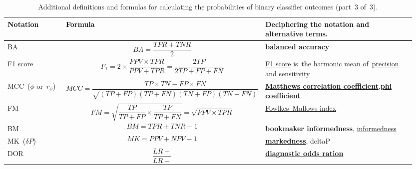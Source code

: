 \documentclass[]{scrreprt}
\begin{document}
\begin{table}[htp]
	\caption{Additional definitions and formulas for calculating the probabilities of binary classifier outcomes (part~3 of~3).}\label{tab:ROC-rates-3}
	\tiny
	\begin{tabularx}{\textwidth}{p{0.15\linewidth} p{0.4\linewidth} p{0.4\linewidth}} 
		\hline
		Notation&Formula&Deciphering the notation and alternative terms.\\
		\hline
		BA&\begin{equation}\label{eq:BA}
		BA = \frac{TPR+TNR}{2}
		\end{equation}&\textbf{balanced accuracy}\\
		\hline
		F1 score&\begin{equation}\label{eq:F1-score}
		F_{1} = 2 \times \frac{PPV \times TPR}{PPV +TPR} = \frac{2TP}{2TP + FP + FN}
		\end{equation}&\href{https://en.wikipedia.org/wiki/F-score}{F1 score} is~the harmonic mean of~\href{https://en.wikipedia.org/wiki/Information_retrieval\#Precision}{precision} and \href{https://en.wikipedia.org/wiki/Sensitivity_(test)}{sensitivity}~\cite{Wiki:F-score}\\
		\hline
		MCC~($\phi$ or~$r_{\phi}$)&\begin{equation}\label{eq:MCC}
		MCC = \frac{TP \times TN - FP \times FN}{\sqrt{(TP+FP)(TP+FN)(TN+FP)(TN+FN)}}
		\end{equation}&\href{https://en.wikipedia.org/wiki/Phi_coefficient}{\textbf{Matthews correlation coefficient}},\href{https://en.wikipedia.org/wiki/Phi_coefficient}{\textbf{phi coefficient}}~\cite{Wiki:phi-coefficient}\\
		\hline
		FM&\begin{equation}\label{eq:FM}
		FM = \sqrt{\dfrac{TP}{TP+FP} \times \dfrac{TP}{TP+FN}} = \sqrt{PPV \times TPR}
		\end{equation}&\href{https://en.wikipedia.org/wiki/Fowlkes–Mallows_index}{Fowlkes–Mallows index}~\cite{Wiki:Fowlkes–Mallows-index}\\
		\hline
		BM&\begin{equation}\label{eq:BM}
		BM = TPR + TNR -1
		\end{equation}&\textbf{bookmaker informedness}, \href{https://en.wikipedia.org/wiki/Youden's_J_statistic}{informedness}~\cite{Wiki:j-statistic}\\
		\hline
		MK~($\delta P$)&\begin{equation}\label{eq:MK}
		MK = PPV + NPV - 1
		\end{equation}&\href{https://en.wikipedia.org/wiki/Markedness}{\textbf{markedness}}, deltaP~\cite{Wiki:markedness}\\
		\hline
		DOR&\begin{equation}\label{eq:DOR}
		\frac{LR+}{LR-}
		\end{equation}&\href{https://en.wikipedia.org/wiki/Diagnostic_odds_ratio}{\textbf{diagnostic odds ration}}~\cite{Wiki:DOR}\\
		\hline
	\end{tabularx}
	\normalsize
\end{table}
\end{document}
